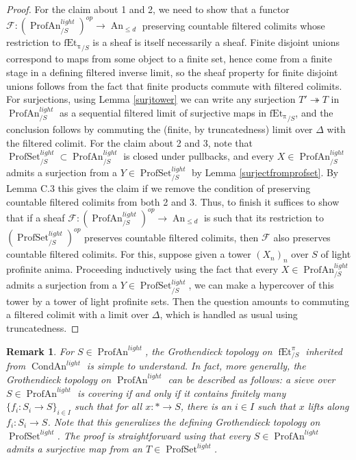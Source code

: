 \documentclass[12pt]{article}
\newtheorem{remark}[theorem]{Remark}
\newcommand{\on}{\operatorname}
\begin{document}
\begin{proof}
For the claim about 1 and 2, we need to show that a functor $\mathcal{F}:(\on{ProfAn}^{light}_{/S})^{op}\to \on{An}_{\leq d}$ preserving countable filtered colimits whose restriction to $\on{fEt_\pi}_{/S}$ is a sheaf is itself necessarily a sheaf.  Finite disjoint unions correspond to maps from some object to a finite set, hence come from a finite stage in a defining filtered inverse limit, so the sheaf property for finite disjoint unions follows from the fact that finite products commute with filtered colimits.  For surjections, using Lemma \ref{surjtower} we can write any surjection $T'\twoheadrightarrow T$ in $\on{ProfAn}^{light}_{/S}$ as a sequential filtered limit of surjective maps in $\on{fEt_\pi}_{/S}$, and the conclusion follows by commuting the (finite, by truncatedness) limit over $\Delta$ with the filtered colimit.   For the claim about 2 and 3, note that $\on{ProfSet}^{light}_{/S}\subset\on{ProfAn}^{light}_{/S}$ is closed under pullbacks, and every $X\in \on{ProfAn}^{light}_{/S}$ admits a surjection from a $Y\in \on{ProfSet}^{light}_{/S}$ by Lemma \ref{surjectfromprofset}.  By \cite{HoyoisLefschetz} Lemma C.3 this gives the claim if we remove the condition of preserving countable filtered colimits from both 2 and 3.  Thus, to finish it suffices to show that if a sheaf $\mathcal{F}: (\on{ProfAn}^{light}_{/S})^{op}\to\on{An}_{\leq d}$ is such that its restriction to $(\on{ProfSet}^{light}_{/S})^{op}$ preserves countable filtered colimits, then $\mathcal{F}$ also preserves countable filtered colimits.  For this, suppose given a tower $(X_n)_n$ over $S$ of light profinite anima.  Proceeding inductively using the fact that every $X\in \on{ProfAn}^{light}_{/S}$ admits a surjection from a $Y\in \on{ProfSet}^{light}_{/S}$, we can make a hypercover of this tower by a tower of light profinite sets.  Then the question amounts to commuting a filtered colimit with a limit over $\Delta$, which is handled as usual using truncatedness. \end{proof}

\begin{remark}
For $S\in\on{ProfAn}^{light}$, the Grothendieck topology on $\on{fEt}^\pi_{/S}$ inherited from $\on{CondAn}^{light}$ is simple to understand.  In fact, more generally, the Grothendieck topology on $\on{ProfAn}^{light}$ can be described as follows: a sieve over $S\in\on{ProfAn}^{light}$ is covering if and only if it contains finitely many $\{f_i:S_i\rightarrow S\}_{i\in I}$ such that for all $x:\ast\rightarrow S$, there is an $i\in I$ such that $x$ lifts along $f_i:S_i\rightarrow S$.  Note that this generalizes the defining Grothendieck topology on $\on{ProfSet}^{light}$.  The proof is straightforward using that every $S\in\on{ProfAn}^{light}$ admits a surjective map from an $T\in\on{ProfSet}^{light}$.
\end{remark}
\end{document}
